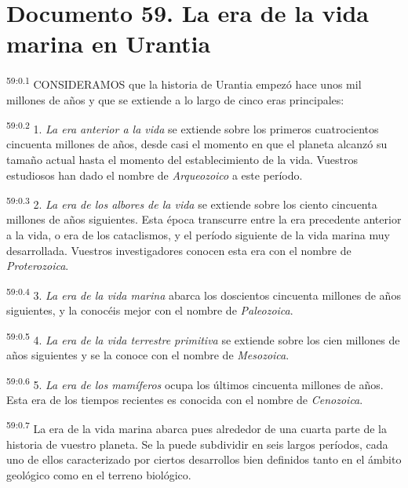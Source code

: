 \chapter{Documento 59. La era de la vida marina en Urantia}
\par
\textsuperscript{59:0.1} CONSIDERAMOS que la historia de Urantia empezó hace unos mil millones de años y que se extiende a lo largo de cinco eras principales:

\par
\textsuperscript{59:0.2} 1. \textit{La era anterior a la vida} se extiende sobre los primeros cuatrocientos cincuenta millones de años, desde casi el momento en que el planeta alcanzó su tamaño actual hasta el momento del establecimiento de la vida. Vuestros estudiosos han dado el nombre de \textit{Arqueozoico} a este período.

\par
\textsuperscript{59:0.3} 2. \textit{La era de los albores de la vida} se extiende sobre los ciento cincuenta millones de años siguientes. Esta época transcurre entre la era precedente anterior a la vida, o era de los cataclismos, y el período siguiente de la vida marina muy desarrollada. Vuestros investigadores conocen esta era con el nombre de \textit{Proterozoica}.

\par
\textsuperscript{59:0.4} 3. \textit{La era de la vida marina} abarca los doscientos cincuenta millones de años siguientes, y la conocéis mejor con el nombre de \textit{Paleozoica}.

\par
\textsuperscript{59:0.5} 4. \textit{La era de la vida terrestre primitiva} se extiende sobre los cien millones de años siguientes y se la conoce con el nombre de \textit{Mesozoica}.

\par
\textsuperscript{59:0.6} 5. \textit{La era de los mamíferos} ocupa los últimos cincuenta millones de años. Esta era de los tiempos recientes es conocida con el nombre de \textit{Cenozoica}.

\par
\textsuperscript{59:0.7} La era de la vida marina abarca pues alrededor de una cuarta parte de la historia de vuestro planeta. Se la puede subdividir en seis largos períodos, cada uno de ellos caracterizado por ciertos desarrollos bien definidos tanto en el ámbito geológico como en el terreno biológico.

